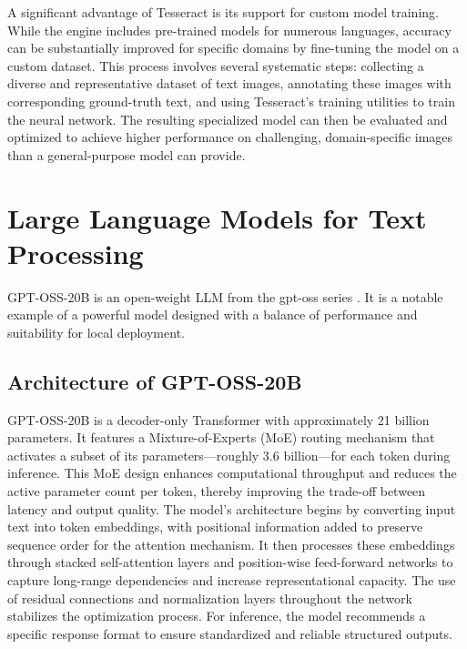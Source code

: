 A significant advantage of Tesseract is its support for custom model training. While the engine includes pre-trained models for numerous languages, accuracy can be substantially improved for specific domains by fine-tuning the model on a custom dataset. This process involves several systematic steps: collecting a diverse and representative dataset of text images, annotating these images with corresponding ground-truth text, and using Tesseract's training utilities to train the neural network. The resulting specialized model can then be evaluated and optimized to achieve higher performance on challenging, domain-specific images than a general-purpose model can provide.

\section{Large Language Models for Text Processing}
\label{sec:background_llm}
GPT-OSS-20B is an open-weight LLM from the gpt-oss series \cite{openai2025gptoss}. It is a notable example of a powerful model designed with a balance of performance and suitability for local deployment.

\subsection{Architecture of GPT-OSS-20B}
GPT-OSS-20B is a decoder-only Transformer with approximately 21 billion parameters. It features a Mixture-of-Experts (MoE) routing mechanism that activates a subset of its parameters—roughly 3.6 billion—for each token during inference. This MoE design enhances computational throughput and reduces the active parameter count per token, thereby improving the trade-off between latency and output quality. The model's architecture begins by converting input text into token embeddings, with positional information added to preserve sequence order for the attention mechanism. It then processes these embeddings through stacked self-attention layers and position-wise feed-forward networks to capture long-range dependencies and increase representational capacity. The use of residual connections and normalization layers throughout the network stabilizes the optimization process. For inference, the model recommends a specific response format to ensure standardized and reliable structured outputs.

